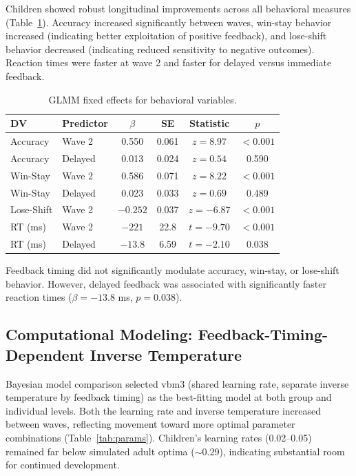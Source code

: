 \documentclass[12pt]{article}
\begin{document}
Children showed robust longitudinal improvements across all behavioral measures (Table~\ref{tab:glmm}). Accuracy increased significantly between waves, win-stay behavior increased (indicating better exploitation of positive feedback), and lose-shift behavior decreased (indicating reduced sensitivity to negative outcomes). Reaction times were faster at wave 2 and faster for delayed versus immediate feedback.

\begin{table}[htbp]
\centering
\caption{GLMM fixed effects for behavioral variables.}
\label{tab:glmm}
\begin{tabular}{llcccc}
\toprule
DV & Predictor & $\beta$ & SE & Statistic & $p$ \\
\midrule
Accuracy & Wave 2 & 0.550 & 0.061 & $z = 8.97$ & $< 0.001$ \\
Accuracy & Delayed & 0.013 & 0.024 & $z = 0.54$ & 0.590 \\
Win-Stay & Wave 2 & 0.586 & 0.071 & $z = 8.22$ & $< 0.001$ \\
Win-Stay & Delayed & 0.023 & 0.033 & $z = 0.69$ & 0.489 \\
Lose-Shift & Wave 2 & $-0.252$ & 0.037 & $z = -6.87$ & $< 0.001$ \\
RT (ms) & Wave 2 & $-221$ & 22.8 & $t = -9.70$ & $< 0.001$ \\
RT (ms) & Delayed & $-13.8$ & 6.59 & $t = -2.10$ & 0.038 \\
\bottomrule
\end{tabular}
\end{table}

Feedback timing did not significantly modulate accuracy, win-stay, or lose-shift behavior. However, delayed feedback was associated with significantly faster reaction times ($\beta = -13.8$ ms, $p = 0.038$).

\subsection{Computational Modeling: Feedback-Timing-Dependent Inverse Temperature}

Bayesian model comparison selected vbm3 (shared learning rate, separate inverse temperature by feedback timing) as the best-fitting model at both group and individual levels. Both the learning rate and inverse temperature increased between waves, reflecting movement toward more optimal parameter combinations (Table~\ref{tab:params}). Children's learning rates (0.02--0.05) remained far below simulated adult optima ($\sim$0.29), indicating substantial room for continued development.
\end{document}
